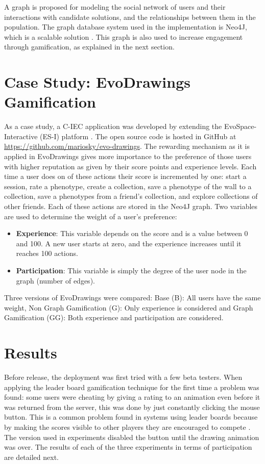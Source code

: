 A graph is proposed for modeling the social network of users and their interactions 
with candidate solutions, and the relationships between them in the population.
The graph database system used in the implementation is Neo4J, which is a scalable solution 
\cite{miller2013graph,holzschuher2013performance}. 
This graph is also used to increase engagement through gamification, as explained in the next section.


\section{Case Study: EvoDrawings Gamification}
\label{sec:evodraw}
As a case study, a C-IEC application was developed by extending the 
EvoSpace-Interactive (ES-I) platform \cite{garcia2013evospace}. 
The open source code is hosted in GitHub at
\url{https://github.com/mariosky/evo-drawings}. The rewarding 
mechanism as it is applied in EvoDrawings gives more importance 
to the preference of those users with higher reputation
as given by their score points and experience levels.  
Each time a user does on of these actions their score is incremented by one:
start a session, rate a phenotype, create a collection, save a phenotype of 
the wall to a collection, save a phenotypes from a friend's collection, and
explore collections of other friends. Each of these actions are stored in
the Neo4J graph. Two variables are used to determine the weight of a user's 
preference:

\begin{itemize}
\item {\bf Experience}: This variable depends on the score and is a value 
between 0 and 100. A new user starts at zero, and the experience increases until
it reaches 100 actions.

\item {\bf Participation}: This variable is simply the degree of the user node 
in the graph (number of edges).    
\end{itemize}

Three versions of EvoDrawings were compared: Base (B): All users have the same weight,
Non Graph Gamification (G): Only experience is considered and Graph Gamification (GG): 
Both experience and participation are considered.  

\section{Results}
\label{sec:results} 
Before release, the deployment was first tried with a few beta testers. 
When applying the leader board gamification technique for the first time a 
problem was found: some users were cheating by giving a
rating to an animation even before it was returned from the server, this was done by just
constantly clicking the mouse button. This is a common problem found in systems using leader
boards because by making the scores visible to other players they are encouraged 
to compete \cite{hickman2010total}. The version used in experiments disabled the button until 
the drawing animation was over. The results of each of the three experiments in 
terms of participation are detailed next.


